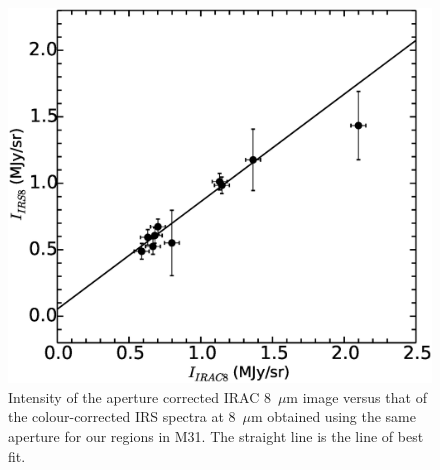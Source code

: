 \begin{figure}
\centering
\includegraphics[scale=0.25]{./fig4.eps}
\caption{Intensity of the aperture corrected IRAC 8~$\mu$m image versus that of the colour-corrected IRS spectra at 8~$\mu$m  
obtained using the same aperture for our regions in M31. The straight line is the line of best fit. }
\label{offset}
\end{figure}


